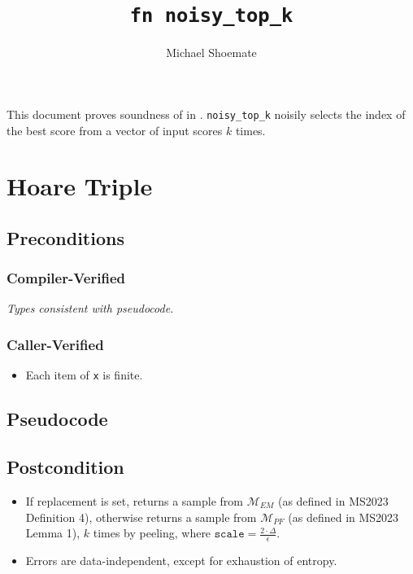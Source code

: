 \documentclass{article}
\title{\texttt{fn noisy\_top\_k}}
\author{Michael Shoemate}
\begin{document}
\maketitle\contrib
This document proves soundness of  in . 
\texttt{noisy\_top\_k} noisily selects the index of the best score from a vector of input scores $k$ times.

\section{Hoare Triple}
\subsection*{Preconditions}
\subsubsection*{Compiler-Verified}
\textit{Types consistent with pseudocode.}

\subsubsection*{Caller-Verified}
\begin{itemize}
    \item Each item of \texttt{x} is finite.
\end{itemize}

\subsection*{Pseudocode}
\label{sec:python-pseudocode}


\subsection*{Postcondition}
\begin{theorem}
    \label{postcondition}

    \begin{itemize}
        \item If replacement is set, returns a sample from $\mathcal{M}_{EM}$ (as defined in MS2023 Definition 4),
            otherwise returns a sample from $\mathcal{M}_{PF}$ (as defined in MS2023 Lemma 1),
            $k$ times by peeling,
            where $\texttt{scale} = \frac{2 \cdot \Delta}{\epsilon}$.
        \item Errors are data-independent, except for exhaustion of entropy.
    \end{itemize}
\end{theorem}
\end{document}
